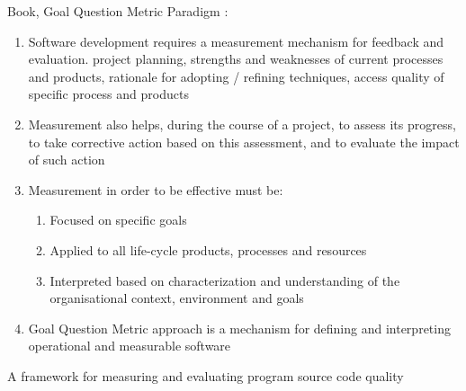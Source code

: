 \noindent Book, Goal Question Metric Paradigm \cite{yi1994goal}:

\begin{enumerate}
    \item Software development requires a measurement mechanism for feedback and evaluation. project planning, strengths and weaknesses of current processes and products, rationale for adopting / refining techniques, access quality of specific process and products
    \item Measurement also helps, during the course of a project, to assess its progress, to take corrective action based on this assessment, and to evaluate the impact of such action
    \item Measurement in order to be effective must be:
    \begin{enumerate}
        \item Focused on specific goals
        \item Applied to all life-cycle products, processes and resources
        \item Interpreted based on characterization and understanding of the organisational context, environment and goals
    \end{enumerate}
    \item Goal Question Metric approach is a mechanism for defining and interpreting operational and measurable software
\end{enumerate}

\noindent A framework for measuring and evaluating program source code quality \cite{washizaki2007framework}

